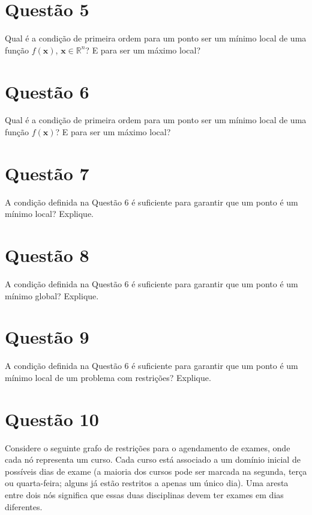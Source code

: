 \documentclass{article}
\begin{document}
\section*{Questão 5}

Qual é a condição de primeira ordem para um ponto ser um mínimo local de uma função \( f(\mathbf{x}) \), \( \mathbf{x} \in \mathbb{R}^n \)? E para ser um máximo local?

\section*{Questão 6}

Qual é a condição de primeira ordem para um ponto ser um mínimo local de uma função \( f(\mathbf{x}) \)? E para ser um máximo local?

\section*{Questão 7}

A condição definida na Questão 6 é suficiente para garantir que um ponto é um mínimo local? Explique.

\section*{Questão 8}

A condição definida na Questão 6 é suficiente para garantir que um ponto é um mínimo global? Explique.

\section*{Questão 9}

A condição definida na Questão 6 é suficiente para garantir que um ponto é um mínimo local de um problema com restrições? Explique.

\section*{Questão 10}

Considere o seguinte grafo de restrições para o agendamento de exames, onde cada nó representa um curso. Cada curso está associado a um domínio inicial de possíveis dias de exame (a maioria dos cursos pode ser marcada na segunda, terça ou quarta-feira; alguns já estão restritos a apenas um único dia). Uma aresta entre dois nós significa que essas duas disciplinas devem ter exames em dias diferentes.
\end{document}
